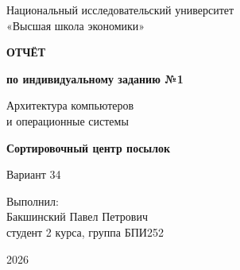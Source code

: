 \documentclass[a4paper,12pt]{article}
\begin{document}
\begin{titlepage}
    \centering
    Национальный исследовательский университет\\[0.4em]
    «Высшая школа экономики»

    \vfill
    \begin{tcolorbox}[myboxstyle,colback=remark_back,colframe=remark_frame,
        boxrule=0.8pt,top=9mm,bottom=9mm]
        \centering
        {\Large\bfseries\color{report_accent} ОТЧЁТ\par}
        \vspace{0.5cm}
        {\large\bfseries по индивидуальному заданию №1\par}
        \vspace{1cm}
        Архитектура компьютеров\\и операционные системы
        \vspace{1cm}

        {\Large\bfseries\color{report_accent} Сортировочный центр посылок\par}
        \vspace{0.5cm}
        {\large Вариант 34\par}
    \end{tcolorbox}

    \vfill
    \begin{flushright}
        Выполнил:\\[0.4em]
        Бакшинский Павел Петрович\\[0.4em]
        студент 2 курса, группа БПИ252
    \end{flushright}
    \vfill
    \materialsbutton
    \par\vspace{0.8cm}
    2026
\end{titlepage}

\pagestyle{plain}
\setcounter{page}{2}
\setlength{\parskip}{3pt}

\end{document}
